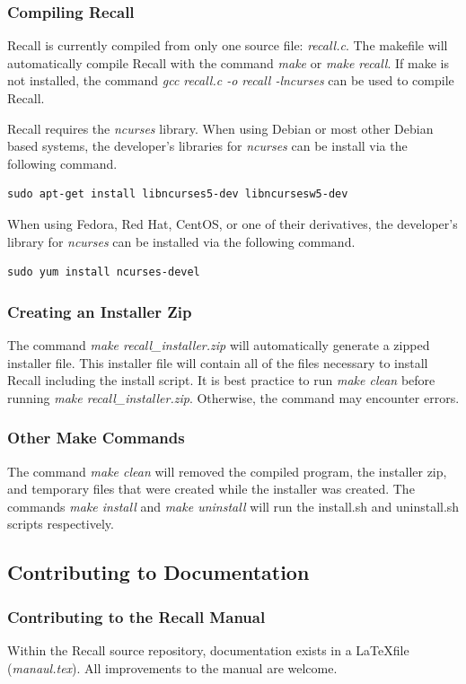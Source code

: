 \documentclass[letterpaper]{article}
\begin{document}
\subsubsection{Compiling Recall}
Recall is currently compiled from only one source file: \textit{recall.c}. The makefile will automatically compile Recall with the command \textit{make} or \textit{make recall}. If make is not installed, the command \textit{gcc recall.c -o recall -lncurses} can be used to compile Recall.

Recall requires the \textit{ncurses} library. When using Debian or most other Debian based systems, the developer's libraries for \textit{ncurses} can be install via the following command.
\begin{verbatim}
sudo apt-get install libncurses5-dev libncursesw5-dev
\end{verbatim}
When using Fedora, Red Hat, CentOS, or one of their derivatives, the developer's library for \textit{ncurses} can be installed via the following command.
\begin{verbatim}
sudo yum install ncurses-devel
\end{verbatim}

\subsubsection{Creating an Installer Zip}
The command \textit{make recall\_installer.zip} will automatically generate a zipped installer file. This installer file will contain all of the files necessary to install Recall including the install script. It is best practice to run \textit{make clean} before running \textit{make recall\_installer.zip}. Otherwise, the command may encounter errors.

\subsubsection{Other Make Commands}
The command \textit{make clean} will removed the compiled program, the installer zip, and temporary files that were created while the installer was created. The commands \textit{make install} and \textit{make uninstall} will run the install.sh and uninstall.sh scripts respectively.

\subsection{Contributing to Documentation}
\subsubsection{Contributing to the Recall Manual} \label{manual.tex}
Within the Recall source repository, documentation exists in a \LaTeX file (\textit{manaul.tex}). All improvements to the manual are welcome.
\end{document}
